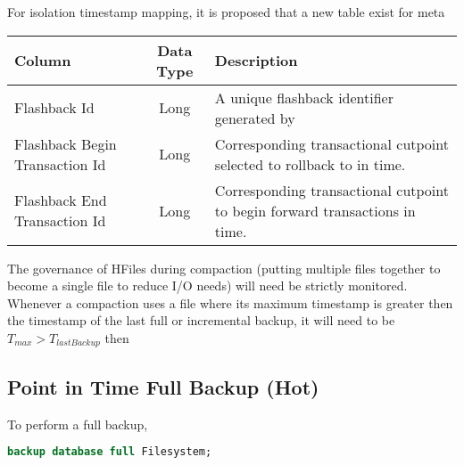 For isolation timestamp mapping, it is proposed that a new table exist for meta


\begin{center}
\begin{tabular}{|l|c|p{5cm}|}
				\hline
				\bf{Column}							&	\bf{Data Type}	&	\bf{Description} \\ \hline
				Flashback Id							&	Long			&	A unique flashback identifier generated by \\
				\hline 
				Flashback Begin Transaction Id				& 	Long			& 	Corresponding
				transactional cutpoint selected to rollback to in time. \\ \hline 
				Flashback End Transaction Id				& 	Long			& 	Corresponding
				transactional cutpoint to begin forward transactions in time. \\
				\hline 
\end{tabular}
\end{center}

The governance of HFiles during compaction (putting multiple files together to
become a single file to reduce I/O needs) will need be strictly monitored. 
Whenever a compaction uses a file where its maximum timestamp is greater then
the timestamp of the last full or incremental backup, it will need to be 
$T_{max} > T_{lastBackup}$ then


\subsection{Point in Time Full Backup (Hot)}

To perform a full backup,

\begin{lstlisting}[frame=single,captionpos=b,language=SQL,caption=Procedure to
Perform a Full Backup] 
backup database full Filesystem;
\end{lstlisting}

